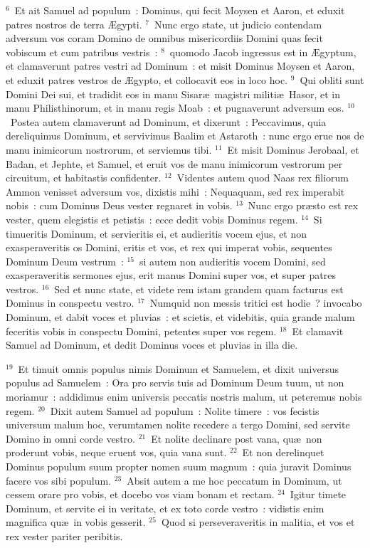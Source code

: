 ${}^{6}$~Et ait Samuel ad populum~: Dominus, qui fecit Moysen et Aaron, et eduxit patres nostros de terra \AE gypti.
${}^{7}$~Nunc ergo state, ut judicio contendam adversum vos coram Domino de omnibus misericordiis Domini quas fecit vobiscum et cum patribus vestris~:
${}^{8}$~quomodo Jacob ingressus est in \AE gyptum, et clamaverunt patres vestri ad Dominum~: et misit Dominus Moysen et Aaron, et eduxit patres vestros de \AE gypto, et collocavit eos in loco hoc.
${}^{9}$~Qui obliti sunt Domini Dei sui, et tradidit eos in manu Sisar\ae\ magistri militi\ae\ Hasor, et in manu Philisthinorum, et in manu regis Moab~: et pugnaverunt adversum eos.
${}^{10}$~Postea autem clamaverunt ad Dominum, et dixerunt~: Peccavimus, quia dereliquimus Dominum, et servivimus Baalim et Astaroth~: nunc ergo erue nos de manu inimicorum nostrorum, et serviemus tibi.
${}^{11}$~Et misit Dominus Jerobaal, et Badan, et Jephte, et Samuel, et eruit vos de manu inimicorum vestrorum per circuitum, et habitastis confidenter.
${}^{12}$~Videntes autem quod Naas rex filiorum Ammon venisset adversum vos, dixistis mihi~: Nequaquam, sed rex imperabit nobis~: cum Dominus Deus vester regnaret in vobis.
${}^{13}$~Nunc ergo pr\ae sto est rex vester, quem elegistis et petistis~: ecce dedit vobis Dominus regem.
${}^{14}$~Si timueritis Dominum, et servieritis ei, et audieritis vocem ejus, et non exasperaveritis os Domini, eritis et vos, et rex qui imperat vobis, sequentes Dominum Deum vestrum~:
${}^{15}$~si autem non audieritis vocem Domini, sed exasperaveritis sermones ejus, erit manus Domini super vos, et super patres vestros.
${}^{16}$~Sed et nunc state, et videte rem istam grandem quam facturus est Dominus in conspectu vestro.
${}^{17}$~Numquid non messis tritici est hodie~? invocabo Dominum, et dabit voces et pluvias~: et scietis, et videbitis, quia grande malum feceritis vobis in conspectu Domini, petentes super vos regem.
${}^{18}$~Et clamavit Samuel ad Dominum, et dedit Dominus voces et pluvias in illa die.


${}^{19}$~Et timuit omnis populus nimis Dominum et Samuelem, et dixit universus populus ad Samuelem~: Ora pro servis tuis ad Dominum Deum tuum, ut non moriamur~: addidimus enim universis peccatis nostris malum, ut peteremus nobis regem.
${}^{20}$~Dixit autem Samuel ad populum~: Nolite timere~: vos fecistis universum malum hoc, verumtamen nolite recedere a tergo Domini, sed servite Domino in omni corde vestro.
${}^{21}$~Et nolite declinare post vana, qu\ae\ non proderunt vobis, neque eruent vos, quia vana sunt.
${}^{22}$~Et non derelinquet Dominus populum suum propter nomen suum magnum~: quia juravit Dominus facere vos sibi populum.
${}^{23}$~Absit autem a me hoc peccatum in Dominum, ut cessem orare pro vobis, et docebo vos viam bonam et rectam.
${}^{24}$~Igitur timete Dominum, et servite ei in veritate, et ex toto corde vestro~: vidistis enim magnifica qu\ae\ in vobis gesserit.
${}^{25}$~Quod si perseveraveritis in malitia, et vos et rex vester pariter peribitis.

